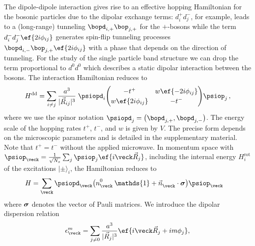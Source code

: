 The dipole-dipole interaction gives rise to an effective hopping Hamiltonian for the bosonic particles due to the dipolar exchange terms:
$d^+_id^-_j$, for example, leads to a (long-range) tunneling $\bopd_{i,+}\bop_{j,+}$ for the ${+}$-bosons while the term $d^-_i d^-_j \ef{2i\phi_{i j}}$ generates spin-flip tunneling processes $\bopd_{i,-}\bop_{j,+} \ef{2i\phi_{ij}}$ with a phase that depends on the direction of tunneling.
For the study of the single particle band structure we can drop the term proportional to $d^0 d^0$ which describes a static dipolar interaction between the bosons.
The interaction Hamiltonian reduces to
\begin{align}
    H^{\text{dd}} = \sum_{i\ne j}
    \frac{a^3}{|\vec{R}_{ij}|^3}\;
    \psiopd_i\!
    \begingroup
        \renewcommand*{\arraystretch}{1.2}
        \begin{pmatrix}
            -t^+ & w \ef{-2i\phi_{ij}} \\
            w \ef{2i\phi_{ij}} & -t^-
        \end{pmatrix}
    \endgroup\!
    \psiop_j \,,
    \label{eq:hrealspace}
\end{align}
where we use the spinor notation $\psiopd_j = \big( \bopd_{j,+} , \bopd_{j,-} \big)$.
The energy scale of the hopping rates $t^+$, $t^-$, and $w$ is given by $V$. The precise form depends on the microscopic parameters and is detailed in the supplementary material.
Note that $t^{+} = t^{-}$ without the applied microwave.
In momentum space with $\psiop_{\veck}=\frac{1}{\sqrt{N_s}}\sum_{j} \psiop_{j}\ef{i\veck\vec{R}_j}$, including the internal energy $H_{i}^{\text{rot}}$ of the excitations $|\pm\rangle_{i}$, the Hamiltonian reduces to
\begin{align}
    H &= \sum_{\veck} \psiopd_{\veck} \big({n^{0\vphantom\dagger}_{\veck} \: \mathds{1} + \vec{n}^{\vphantom \dagger}_{\veck}\cdot\vecsigma}\big) \psiop_{\veck}
    \label{eq:hkspace}
\end{align}
where $\boldsymbol{\sigma}$ denotes the vector of Pauli matrices.
We introduce the dipolar dispersion relation~\cite{Peter2012b,Syzranov2014}
\begin{align}
    \epsilon^m_{\veck} = \sum_{j\ne 0} \frac{a^3}{|\vec{R}_j|^3}\ef{i\veck \vec{R}_j + i m \phi_{j}}, %
\end{align}
